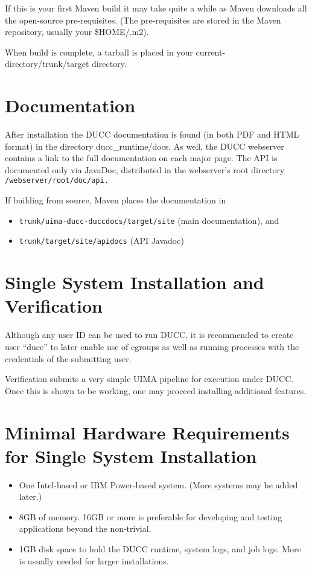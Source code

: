 If this is your first Maven build it may take quite a while as Maven downloads all the
open-source pre-requisites.  (The pre-requisites are stored in the Maven repository, usually
your \$HOME/.m2).

When build is complete, a tarball is placed in your current-directory/trunk/target
directory.

\section{Documentation}
\begin{sloppypar}
After installation the DUCC documentation is found (in both PDF and HTML format) in the directory 
ducc\_runtime/docs.  As well, the DUCC webserver contains a link to the full documentation on each major page.
The API is documented only via JavaDoc, distributed in the webserver's root directory 
{\tt \duccruntime/webserver/root/doc/api.}  
\end{sloppypar}

If building from source, Maven places the documentation in
\begin{itemize}
    \item {\tt trunk/uima-ducc-duccdocs/target/site} (main documentation), and 
    \item {\tt trunk/target/site/apidocs} (API Javadoc)
\end{itemize}

\section{Single System Installation and Verification}

Although any user ID can be used to run DUCC, it is recommended to create user ``ducc''
to later enable use of cgroups as well as running processes with the credentials of the submitting user.

Verification submits a very simple UIMA pipeline for execution under DUCC.  Once this is shown to be
working, one may proceed installing additional features.


\section{Minimal Hardware Requirements for Single System Installation}
\begin{itemize}
    \item One Intel-based or IBM Power-based system.  (More systems may be added later.)

    \item 8GB of memory.  16GB or more is preferable for developing and testing applications beyond
      the non-trivial.  

    \item 1GB disk space to hold the DUCC runtime, system logs, and job logs.  More is
      usually needed for larger installations.  
\end{itemize}

